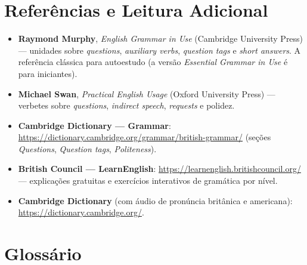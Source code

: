 \documentclass[12pt,a4paper,oneside]{book}
\begin{document}
\appendix
\chapter{Referências e Leitura Adicional}

\begin{itemize}
  \item \textbf{Raymond Murphy}, \emph{English Grammar in Use} (Cambridge University Press) --- unidades sobre \emph{questions}, \emph{auxiliary verbs}, \emph{question tags} e \emph{short answers}. A referência clássica para autoestudo (a versão \emph{Essential Grammar in Use} é para iniciantes).
  \item \textbf{Michael Swan}, \emph{Practical English Usage} (Oxford University Press) --- verbetes sobre \emph{questions}, \emph{indirect speech}, \emph{requests} e polidez.
  \item \textbf{Cambridge Dictionary --- Grammar}: \url{https://dictionary.cambridge.org/grammar/british-grammar/} (seções \emph{Questions}, \emph{Question tags}, \emph{Politeness}).
  \item \textbf{British Council --- LearnEnglish}: \url{https://learnenglish.britishcouncil.org/} --- explicações gratuitas e exercícios interativos de gramática por nível.
  \item \textbf{Cambridge Dictionary} (com áudio de pronúncia britânica e americana): \url{https://dictionary.cambridge.org/}.
\end{itemize}

\chapter{Glossário}
\end{document}
